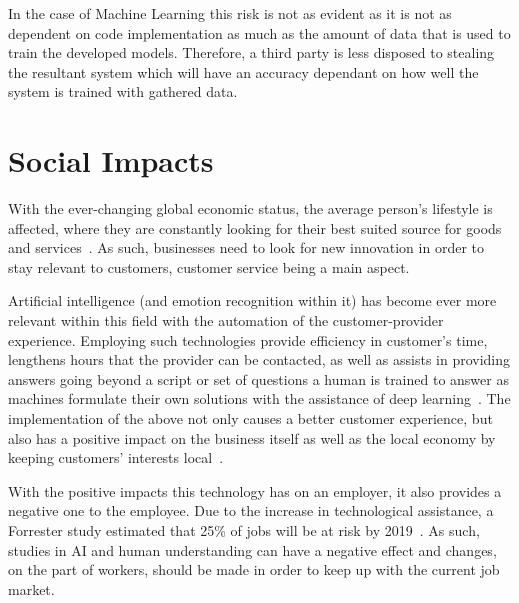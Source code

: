 \documentclass[10pt,twocolumn]{witseiepaper}
\begin{document}
In the case of Machine Learning this risk is not as evident as it is not as dependent on code implementation as much as the amount of data that is used to train the developed models. Therefore, a third party is less disposed to stealing the resultant system which will have an accuracy dependant on how well the system is trained with gathered data.

\section{Social Impacts}\label{sec:social}
With the ever-changing global economic status, the average person's lifestyle is affected, where they are constantly looking for their best suited source for goods and services~\cite{airelevant}. As such, businesses need to look for new innovation in order to stay relevant to customers, customer service being a main aspect. 

Artificial intelligence (and emotion recognition within it) has become ever more relevant within this field with the automation of the customer-provider experience. Employing such technologies provide efficiency in customer's time, lengthens hours that the provider can be contacted, as well as assists in providing answers going beyond a script or set of questions a human is trained to answer as machines formulate their own solutions with the assistance of deep learning~\cite{airelevant}. The implementation of the above not only causes a better customer experience, but also has a positive impact on the business itself as well as the local economy by keeping customers' interests local~\cite{airelevant}.

With the positive impacts this technology has on an employer, it also provides a negative one to the employee. Due to the increase in technological assistance, a Forrester study estimated that 25\% of jobs will be at risk by 2019~\cite{chatbot}. As such, studies in AI and human understanding can have a negative effect and changes, on the part of workers, should be made in order to keep up with the current job market.
\end{document}
